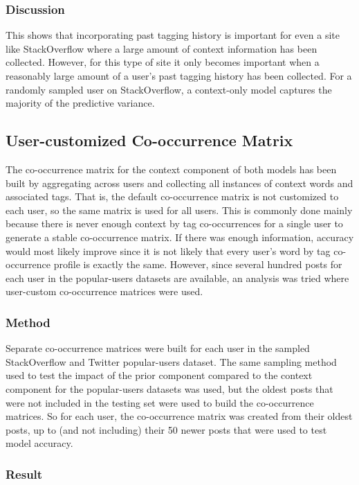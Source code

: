 \documentclass[man,floatsintext,donotrepeattitle]{apa6}
\begin{document}
\subsubsection{Discussion}

This shows that incorporating past tagging history is important for even a site like StackOverflow where a large amount of context information has been collected.
However, for this type of site it only becomes important when a reasonably large amount of a user's past tagging history has been collected.
For a randomly sampled user on StackOverflow, a context-only model captures the majority of the predictive variance.

\subsection{User-customized Co-occurrence Matrix}

The co-occurrence matrix for the context component of both models has been built by aggregating across users and collecting all instances of context words and associated tags.
That is, the default co-occurrence matrix is not customized to each user, so the same matrix is used for all users.
This is commonly done mainly because there is never enough context by tag co-occurrences for a single user to generate a stable co-occurrence matrix.
If there was enough information, accuracy would most likely improve since it is not likely that every user's word by tag co-occurrence profile is exactly the same.
However, since several hundred posts for each user in the popular-users datasets are available, an analysis was tried where user-custom co-occurrence matrices were used.

\subsubsection{Method}

Separate co-occurrence matrices were built for each user in the sampled StackOverflow and Twitter popular-users dataset.
The same sampling method used to test the impact of the prior component compared to the context component for the popular-users datasets was used,
but the oldest posts that were not included in the testing set were used to build the co-occurrence matrices.
So for each user, the co-occurrence matrix was created from their oldest posts, up to (and not including) their 50 newer posts that were used to test model accuracy. 

\subsubsection{Result}
\end{document}
